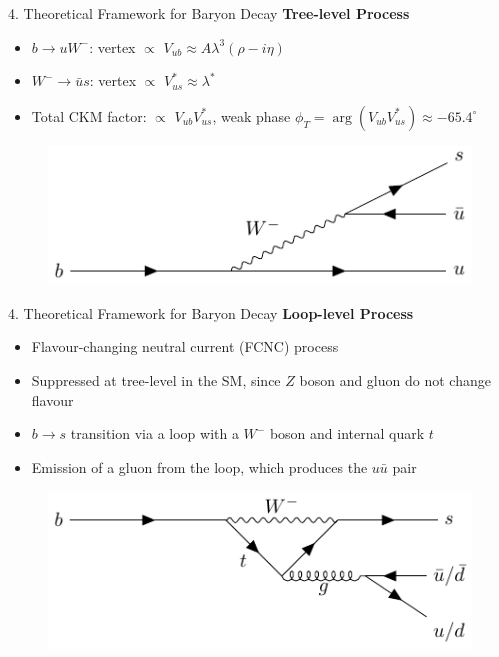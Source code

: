 \documentclass[xcolor=dvipsnames]{beamer}
\def\l{\lambda}
\begin{document}
\begin{frame}{4. Theoretical Framework for Baryon Decay}
\textbf{Tree-level Process}
\begin{itemize}
    \item $b\to u W^{-}$: vertex $\propto$ $V_{ub}\approx A\l^{3}(\rho-i\eta)$
    \item $W^{-}\to \bar{u}s$: vertex $\propto$ $V_{us}^\ast\approx \l^\ast$
    \item Total CKM factor: $\propto$ $V_{ub}V_{us}^\ast$, weak phase $\phi_{T}=\arg(V_{ub}V_{us}^\ast)\approx -65.4^\circ$
\end{itemize}
\begin{figure}
    \centering
    \includegraphics[width=0.6\linewidth]{b_tree.pdf}
\end{figure}
\end{frame}

\begin{frame}{4. Theoretical Framework for Baryon Decay}
\textbf{Loop-level Process}\\
\begin{itemize}
    \item Flavour-changing neutral current (FCNC) process
    \item Suppressed at tree-level in the SM, since $Z$ boson and gluon do not change flavour
    \item $b\to s$ transition via a loop with a $W^{-}$ boson and internal quark $t$
    \item Emission of a gluon from the loop, which produces the $u\bar{u}$ pair
\end{itemize}
\begin{figure}
    \centering
    \includegraphics[width=0.6\linewidth]{b_loop.pdf}
\end{figure}
\end{frame}
\end{document}
